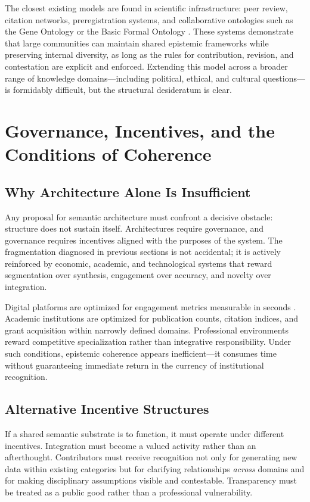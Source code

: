 \documentclass[11pt]{article}
\begin{document}
The closest existing models are found in scientific infrastructure: peer review, citation networks, preregistration systems, and collaborative ontologies such as the Gene Ontology or the Basic Formal Ontology \citep{Smith2007}. These systems demonstrate that large communities can maintain shared epistemic frameworks while preserving internal diversity, as long as the rules for contribution, revision, and contestation are explicit and enforced. Extending this model across a broader range of knowledge domains---including political, ethical, and cultural questions---is formidably difficult, but the structural desideratum is clear.

\section{Governance, Incentives, and the Conditions of Coherence}
\label{sec:governance}

\subsection{Why Architecture Alone Is Insufficient}

Any proposal for semantic architecture must confront a decisive obstacle: structure does not sustain itself. Architectures require governance, and governance requires incentives aligned with the purposes of the system. The fragmentation diagnosed in previous sections is not accidental; it is actively reinforced by economic, academic, and technological systems that reward segmentation over synthesis, engagement over accuracy, and novelty over integration.

Digital platforms are optimized for engagement metrics measurable in seconds \citep{Zuboff2019}. Academic institutions are optimized for publication counts, citation indices, and grant acquisition within narrowly defined domains. Professional environments reward competitive specialization rather than integrative responsibility. Under such conditions, epistemic coherence appears inefficient---it consumes time without guaranteeing immediate return in the currency of institutional recognition.

\subsection{Alternative Incentive Structures}

If a shared semantic substrate is to function, it must operate under different incentives. Integration must become a valued activity rather than an afterthought. Contributors must receive recognition not only for generating new data within existing categories but for clarifying relationships \emph{across} domains and for making disciplinary assumptions visible and contestable. Transparency must be treated as a public good rather than a professional vulnerability.
\end{document}
